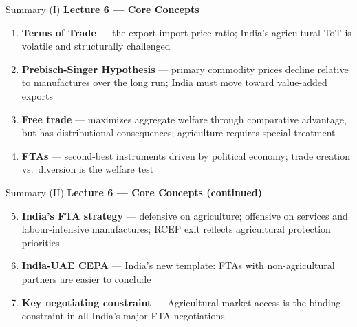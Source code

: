 \documentclass[
  ignorenonframetext,
  aspectratio=169,
]{beamer}
\makeatletter
\let\quarto@originallabel\label
\DeclareRobustCommand*{\label}[1]{\quarto@originallabel{#1}}
\makeatother
\begin{document}
\begin{frame}{Summary (I)}
\label{summary-i}
\textbf{Lecture 6 --- Core Concepts}

\begin{enumerate}
\item
  \textbf{Terms of Trade} --- the export-import price ratio; India's
  agricultural ToT is volatile and structurally challenged
\item
  \textbf{Prebisch-Singer Hypothesis} --- primary commodity prices
  decline relative to manufactures over the long run; India must move
  toward value-added exports
\item
  \textbf{Free trade} --- maximizes aggregate welfare through
  comparative advantage, but has distributional consequences;
  agriculture requires special treatment
\item
  \textbf{FTAs} --- second-best instruments driven by political economy;
  trade creation vs.~diversion is the welfare test
\end{enumerate}
\end{frame}

\begin{frame}{Summary (II)}
\label{summary-ii}
\textbf{Lecture 6 --- Core Concepts (continued)}

\begin{enumerate}
\setcounter{enumi}{4}
\item
  \textbf{India's FTA strategy} --- defensive on agriculture; offensive
  on services and labour-intensive manufactures; RCEP exit reflects
  agricultural protection priorities
\item
  \textbf{India-UAE CEPA} --- India's new template: FTAs with
  non-agricultural partners are easier to conclude
\item
  \textbf{Key negotiating constraint} --- Agricultural market access is
  the binding constraint in all India's major FTA negotiations
\end{enumerate}
\end{frame}
\end{document}
